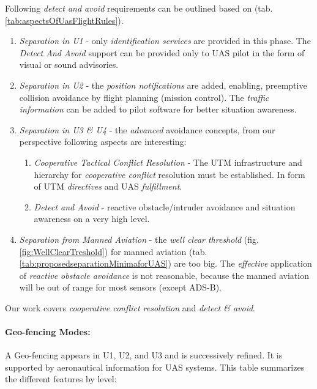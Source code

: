 \noindent Following \emph{detect and avoid} requirements can be outlined based on (tab. \ref{tab:aspectsOfUasFlightRules}).
\begin{enumerate}
    \item \emph{Separation in U1} - only \emph{identification services} are provided in this phase. The \emph{Detect And Avoid} support can be provided only to UAS pilot in the form of visual or sound advisories. 
    
    \item \emph{Separation in U2} - the \emph{position notifications} are added, enabling, preemptive collision avoidance by flight planning (mission control). The \emph{traffic information} can be added to pilot software for better situation awareness.  


    \item \emph{Separation in U3 \& U4} - the \emph{advanced} avoidance concepts, from our perspective following aspects are interesting: 
    \begin{enumerate}[a]
        \item \emph{Cooperative Tactical Conflict Resolution} - The UTM infrastructure and hierarchy for \emph{cooperative conflict} resolution must be established. In form of UTM \emph{directives} and UAS \emph{fulfillment}.
        
        \item \emph{Detect and Avoid} - reactive obstacle/intruder avoidance and situation awareness on a very high level.
    \end{enumerate}
    
    \item \emph{Separation from Manned Aviation} - the \emph{well clear threshold} (fig. \ref{fig:WellClearTreshold}) for manned aviation  (tab.\ref{tab:proposedseparationMinimaforUAS}) are too big. The \emph{effective} application of \emph{reactive obstacle avoidance} is not reasonable, because the manned aviation will be out of range for most sensors (except ADS-B).
\end{enumerate}

\begin{note}
    Our work covers \emph{cooperative conflict resolution} and \emph{detect \& avoid}.
\end{note}

\paragraph{Geo-fencing Modes:} A Geo-fencing appears in U1, U2, and U3 and is successively refined. It is supported by aeronautical information for UAS systems. This table summarizes the different features by level:

